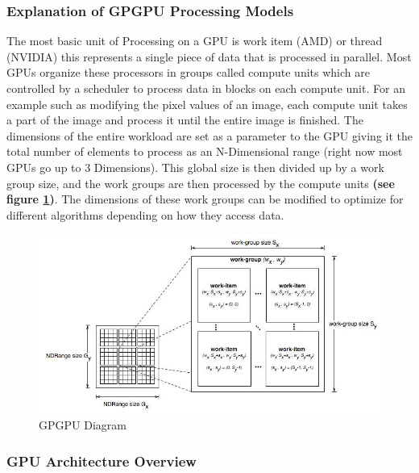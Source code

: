 \documentclass[a4paper,10pt,twoside]{article}
\begin{document}
\subsubsection{Explanation of GPGPU Processing Models}
The most basic unit of Processing on a GPU is work item (AMD) or thread (NVIDIA) this represents a single piece of data that is processed in parallel. Most GPUs organize these processors in groups called 
compute units which are controlled by a scheduler to process data in blocks on each compute unit. For an example such as modifying the pixel values of an image, each compute unit takes a part of the image 
and process it until the entire image is finished. The dimensions of the entire workload are set as a parameter to the GPU giving it the total number of elements to process as an N-Dimensional range (right 
now most GPUs go up to 3 Dimensions). This global size is then divided up by a work group size, and the work groups are then processed by the compute units \textbf{ (see figure \ref{fig:gpu})}. The dimensions of these work groups 
can be modified to optimize for different algorithms depending on how they access data. 
	\begin{figure}[H]
	\includegraphics[width=\linewidth,height=\paperheight,keepaspectratio]{gpgpu.jpg}
	\caption{GPGPU Diagram}
	\label{fig:gpu}
	\end{figure}
\pagebreak

\subsubsection{GPU Architecture Overview}
\end{document}
